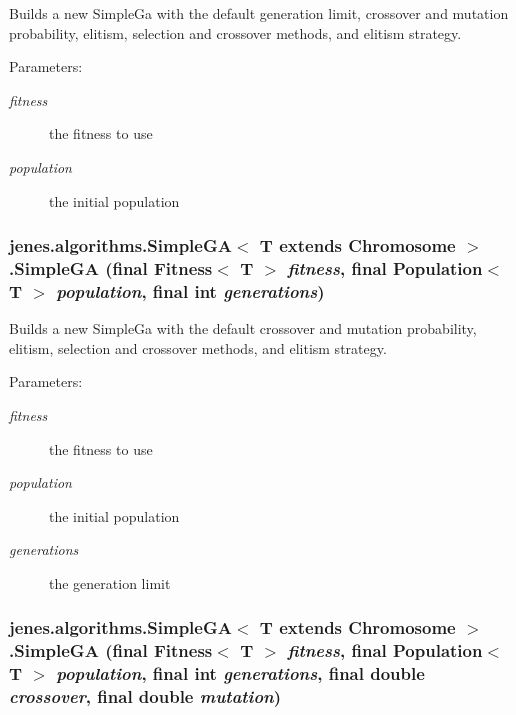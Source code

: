 Builds a new SimpleGa with the default generation limit, crossover and mutation probability, elitism, selection and crossover methods, and elitism strategy.

\begin{Desc}
\item[Parameters:]
\begin{description}
\item[{\em fitness}]the fitness to use \item[{\em population}]the initial population \end{description}
\end{Desc}
\hypertarget{classjenes_1_1algorithms_1_1_simple_g_a_3_01_t_01extends_01_chromosome_01_4_cbdaae378fd9263001e6393cb132bda4}{
\subsubsection[SimpleGA]{\setlength{\rightskip}{0pt plus 5cm}jenes.algorithms.SimpleGA$<$ T extends Chromosome $>$.SimpleGA (final Fitness$<$ T $>$ {\em fitness}, \/  final Population$<$ T $>$ {\em population}, \/  final int {\em generations})}}
\label{classjenes_1_1algorithms_1_1_simple_g_a_3_01_t_01extends_01_chromosome_01_4_cbdaae378fd9263001e6393cb132bda4}


Builds a new SimpleGa with the default crossover and mutation probability, elitism, selection and crossover methods, and elitism strategy.

\begin{Desc}
\item[Parameters:]
\begin{description}
\item[{\em fitness}]the fitness to use \item[{\em population}]the initial population \item[{\em generations}]the generation limit \end{description}
\end{Desc}
\hypertarget{classjenes_1_1algorithms_1_1_simple_g_a_3_01_t_01extends_01_chromosome_01_4_9382ccbfaed16b3dbf4feeb23afa71e8}{
\subsubsection[SimpleGA]{\setlength{\rightskip}{0pt plus 5cm}jenes.algorithms.SimpleGA$<$ T extends Chromosome $>$.SimpleGA (final Fitness$<$ T $>$ {\em fitness}, \/  final Population$<$ T $>$ {\em population}, \/  final int {\em generations}, \/  final double {\em crossover}, \/  final double {\em mutation})}}
\label{classjenes_1_1algorithms_1_1_simple_g_a_3_01_t_01extends_01_chromosome_01_4_9382ccbfaed16b3dbf4feeb23afa71e8}


